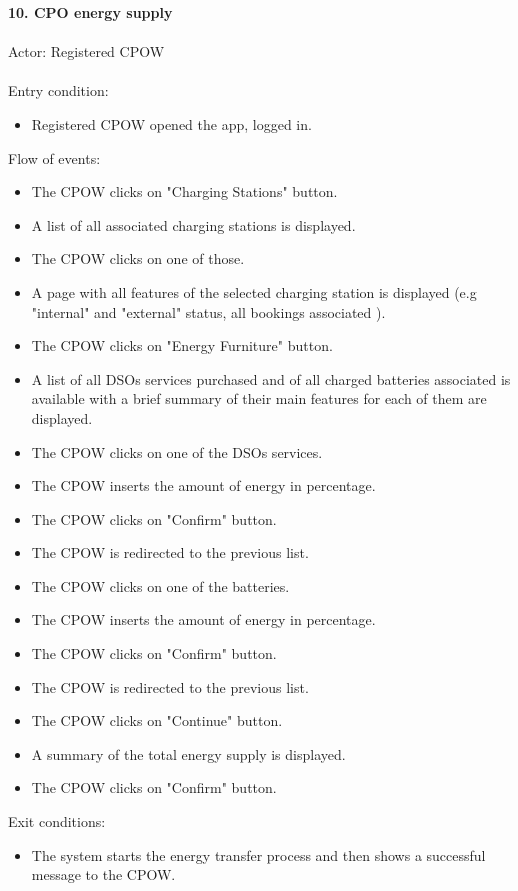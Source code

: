 \documentclass[a4paper]{report}
\begin{document}
\textbf{10. CPO energy supply}\label{uc:8}
\\ \\
Actor: Registered CPOW \\ \\
Entry condition: 
\begin{itemize}
\item Registered CPOW opened the app, logged in.
\end{itemize}
Flow of events:
\begin{itemize}
\item The CPOW clicks on "Charging Stations" button.
\item A list of all associated charging stations is displayed.
\item The CPOW clicks on one of those.
\item A page with all features of the selected charging station is displayed (e.g "internal" and "external" status, all bookings associated ).
\item The CPOW clicks on "Energy Furniture" button.
\item A list of all DSOs services purchased and of all charged batteries associated is available with a brief summary of their main features for each of them are displayed.
\item The CPOW clicks on one of the DSOs services.
\item The CPOW inserts the amount of energy in percentage.
\item The CPOW clicks on "Confirm" button.
\item The CPOW is redirected to the previous list.
\item The CPOW clicks on one of the batteries.
\item The CPOW inserts the amount of energy in percentage.
\item The CPOW clicks on "Confirm" button.
\item The CPOW is redirected to the previous list.
\item The CPOW clicks on "Continue" button.
\item A summary of the total energy supply is displayed.
\item The CPOW clicks on "Confirm" button.
\end{itemize}
Exit conditions: 
\begin{itemize}
\item The system starts the energy transfer process and then shows a successful message to the CPOW.
\end{itemize} 
\end{document}
